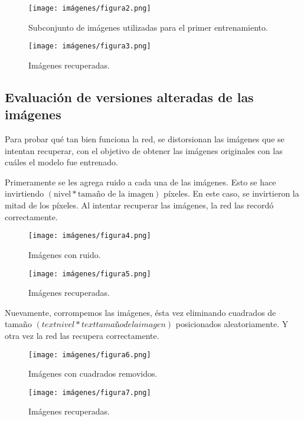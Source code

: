 \documentclass[a4paper,12pt]{article}
\begin{document}
\begin{figure}[h]
    \centering
    \texttt{[image: imágenes/figura2.png]}
    \caption{Subconjunto de imágenes utilizadas para el primer entrenamiento.}
    \label{fig:figura2}
\end{figure}

\begin{figure}[h]
    \centering
    \texttt{[image: imágenes/figura3.png]}
    \caption{Imágenes recuperadas.}
    \label{fig:figura3}
\end{figure}

\subsection{Evaluación de versiones alteradas de las imágenes}
Para probar qué tan bien funciona la red, se distorsionan las imágenes que se intentan recuperar, con el objetivo de obtener las imágenes originales con las cuáles el modelo fue entrenado.

Primeramente se les agrega ruido a cada una de las imágenes. Esto se hace invirtiendo $(\text{nivel}*\text{tamaño de la imagen})$ píxeles. En este caso, se invirtieron la mitad de los píxeles. Al intentar recuperar las imágenes, la red las recordó correctamente.

\begin{figure}[h]
    \centering
    \texttt{[image: imágenes/figura4.png]}
    \caption{Imágenes con ruido.}
    \label{fig:figura4}
\end{figure}

\begin{figure}[h]
    \centering
    \texttt{[image: imágenes/figura5.png]}
    \caption{Imágenes recuperadas.}
    \label{fig:figura5}
\end{figure}

Nuevamente, corrompemos las imágenes, ésta vez eliminando cuadrados de tamaño $(text{nivel}*text{tamaño de la imagen})$ posicionados aleatoriamente. Y otra vez la red las recupera correctamente.

\begin{figure}[h]
    \centering
    \texttt{[image: imágenes/figura6.png]}
    \caption{Imágenes con cuadrados removidos.}
    \label{fig:figura6}
\end{figure}

\begin{figure}[h]
    \centering
    \texttt{[image: imágenes/figura7.png]}
    \caption{Imágenes recuperadas.}
    \label{fig:figura7}
\end{figure}
\end{document}
